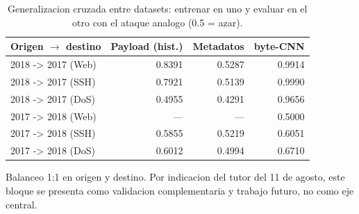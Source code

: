 \begin{table}[htbp]
  \centering
  \caption{Generalizacion cruzada entre datasets: entrenar en uno y evaluar en el otro con el ataque analogo (0.5 = azar).}
  \label{tab:cruzado}
  \begin{tabular}{lrrr}
    \toprule
    \textbf{Origen $\rightarrow$ destino} & \textbf{Payload (hist.)} & \textbf{Metadatos} & \textbf{byte-CNN} \\
    \midrule
    2018 -> 2017 (Web) & 0.8391 & 0.5287 & 0.9914 \\
    2018 -> 2017 (SSH) & 0.7921 & 0.5139 & 0.9990 \\
    2018 -> 2017 (DoS) & 0.4955 & 0.4291 & 0.9656 \\
    2017 -> 2018 (Web) & --- & --- & 0.5000 \\
    2017 -> 2018 (SSH) & 0.5855 & 0.5219 & 0.6051 \\
    2017 -> 2018 (DoS) & 0.6012 & 0.4994 & 0.6710 \\
    \bottomrule
  \end{tabular}
  \par\smallskip\footnotesize{Balanceo 1:1 en origen y destino. Por indicacion del tutor del 11 de agosto, este bloque se presenta como validacion complementaria y trabajo futuro, no como eje central.}
\end{table}
